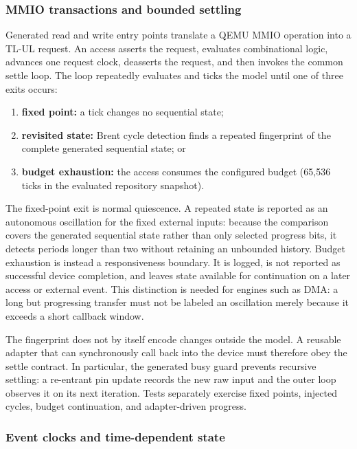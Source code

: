 \subsubsection{MMIO transactions and bounded settling}

Generated read and write entry points translate a QEMU MMIO operation into a
TL-UL request.  An access asserts the request, evaluates combinational logic,
advances one request clock, deasserts the request, and then invokes the common
settle loop.  The loop repeatedly evaluates and ticks the model until one of
three exits occurs:
\begin{enumerate}
  \item \textbf{fixed point:} a tick changes no sequential state;
  \item \textbf{revisited state:} Brent cycle detection finds a repeated
        fingerprint of the complete generated sequential state; or
  \item \textbf{budget exhaustion:} the access consumes the configured budget
        (65,536 ticks in the evaluated repository snapshot).
\end{enumerate}

The fixed-point exit is normal quiescence.  A repeated state is reported as an
autonomous oscillation for the fixed external inputs: because the comparison
covers the generated sequential state rather than only selected progress bits,
it detects periods longer than two without retaining an unbounded history.
Budget exhaustion is instead a responsiveness boundary.  It is logged, is not
reported as successful device completion, and leaves state available for
continuation on a later access or external event.  This distinction is needed
for engines such as DMA: a long but progressing transfer must not be labeled an
oscillation merely because it exceeds a short callback window.

The fingerprint does not by itself encode changes outside the model.  A reusable
adapter that can synchronously call back into the device must therefore obey the
settle contract.  In particular, the generated busy guard prevents recursive
settling: a re-entrant pin update records the new raw input and the outer loop
observes it on its next iteration.  Tests separately exercise fixed points,
injected cycles, budget continuation, and adapter-driven progress.

\subsubsection{Event clocks and time-dependent state}

